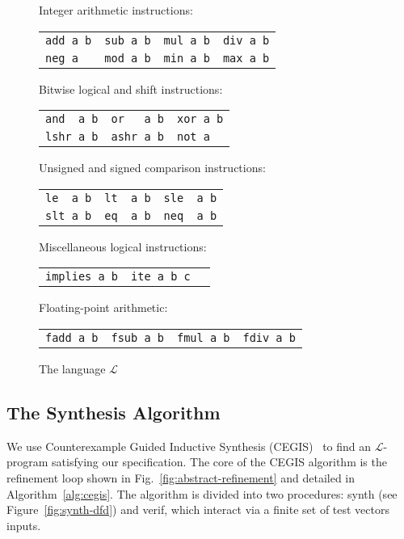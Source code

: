 \documentclass[preprint]{sigplanconf}
\theoremstyle{definition}
\begin{document}
\begin{figure}
{\small
\begin{center}
\setlength{\tabcolsep}{16pt}
Integer arithmetic instructions:

\begin{tabular}{llll}
 \verb|add a b| & \verb|sub a b| & \verb|mul a b| & \verb|div a b| \\
 \verb|neg a| &   \verb|mod a b| & \verb|min a b| & \verb|max a b|
\end{tabular}

\medskip

Bitwise logical and shift instructions:

\begin{tabular}{lll}
 \verb|and  a b| & \verb|or   a b| & \verb|xor a b| \\
 \verb|lshr a b| & \verb|ashr a b| & \verb|not a|
\end{tabular}

\medskip

Unsigned and signed comparison instructions:

\begin{tabular}{lll}
 \verb|le  a b| & \verb|lt  a b| & \verb|sle  a b| \\
 \verb|slt a b| & \verb|eq  a b| & \verb|neq  a b|
\end{tabular}

Miscellaneous logical instructions:

\begin{tabular}{lll}
 \verb|implies a b| & \verb|ite a b c| & 
\end{tabular}

Floating-point arithmetic:

\begin{tabular}{llll}
 \verb|fadd a b| & \verb|fsub a b| & \verb|fmul a b| & \verb|fdiv a b| 
\end{tabular}


\end{center}
}
 \caption{The language $\mathcal{L}$}
 \label{fig:l-language}
\end{figure}


\subsection{The Synthesis Algorithm}
We use Counterexample Guided Inductive Synthesis (CEGIS)~\cite{lezama-thesis,sketch,DBLP:conf/iclp/BrainCVF06} to
find an $\mathcal{L}$-program satisfying our specification.
The core of the CEGIS algorithm is the refinement loop shown in Fig.~\ref{fig:abstract-refinement} and
detailed in Algorithm~\ref{alg:cegis}.  
The algorithm is divided into two
procedures: {\sc synth} (see Figure~\ref{fig:synth-dfd}) and {\sc verif}, which interact via
a finite set of test vectors {\sc inputs}.
\end{document}
